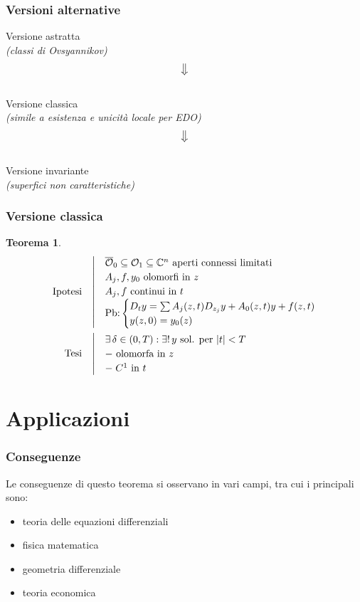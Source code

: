 \documentclass[serif,notheorems]{beamer}
\makeatletter
\newenvironment{ipotesi}%
{\quad\left|\quad\def\arraystretch{1.2}\begin{array}{@{}l@{}}}%
{\end{array}\right.}
\newcommand{\hpth}[2]
{
\begin{align*}
\quad
\text{Ipotesi}
&\begin{ipotesi}
#1
\end{ipotesi}\\
\text{Tesi}
&\begin{ipotesi}
#2
\end{ipotesi}
\end{align*}
}
\theoremstyle{definition} %
\newtheorem{theorem}{Teorema}[section] %
\theoremstyle{remark}
\makeatother
\begin{document}
\begin{frame}
\frametitle{Versioni alternative}
\begin{center}
\normalsize Versione astratta \\
\footnotesize\textit{(classi di Ovsyannikov)}\\
\normalsize $$\big\Downarrow$$\\
\normalsize Versione classica \\
\footnotesize\textit{(simile a esistenza e unicità locale per EDO)}\\
\normalsize $$\big\Downarrow$$\\
\normalsize Versione invariante \\
\footnotesize\textit{(superfici non caratteristiche)}\\
\end{center}
\end{frame}

\begin{frame}
\frametitle{Versione classica}
\begin{theorem}
\vspace{-5mm}
\hpth{
\overline{\mathcal{O}}_0 \subseteq \mathcal{O}_1 \subseteq \mathbb{C}^n \text{ aperti connessi limitati}\\
A_j, f, y_0 \text{ olomorfi in } z\\
A_j, f \text{ continui in } t\\
\text{Pb:}
\begin{cases}
D_t y = \sum A_j (z,t) D_{z_j}y+A_0(z,t)y +f(z,t) \\
y(z,0)=y_0(z)
\end{cases}\\
}{
\exists \, \delta \in (0,T) : \exists !\, y \text{ sol. per } |t|<T \\
- \text{ olomorfa in } z\\
- \; C^1 \text{ in } t
}
\end{theorem}
\end{frame}


\section{Applicazioni}

\begin{frame}
\frametitle{Conseguenze}
Le conseguenze di questo teorema si osservano in vari campi, tra cui i principali sono:
\begin{itemize}
\item teoria delle equazioni differenziali
\item fisica matematica
\item geometria differenziale
\item teoria economica
\end{itemize}
\end{frame}
\end{document}
